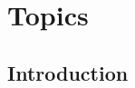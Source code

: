 \chapter{\statusgreen Topics}
\label{chap:topics}

\section{\statusgreen Introduction}
\label{sec:topic_intro}








